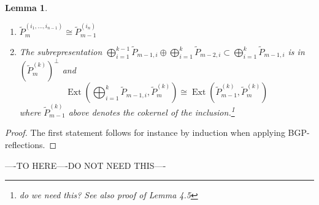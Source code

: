 \documentclass{amsart}
\newtheorem{lemma}[theorem]{Lemma}
\newcommand{\Ext}{\operatorname{Ext}}
\begin{document}
\begin{lemma}
  \begin{enumerate}
    \item $\tilde P_m^{(i_1,\ldots,i_{n-1})}\cong\tilde P_{m-1}^{(i_n)}$
    \item The subrepresentation $\bigoplus_{i=1}^{k-1}\tilde P_{m-1,i}\oplus\bigoplus_{i=1}^k\tilde P_{m-2,i}\subset\bigoplus_{i=1}^k\tilde P_{m-1,i}$ is in $(\tilde P_m^{(k)})^\perp$ and
      \[\Ext(\bigoplus_{i=1}^k\tilde P_{m-1,i},\tilde P_m^{(k)})\cong\Ext(\tilde P_{m-1}^{(k)},\tilde P_m^{(k)})\]
      where $\tilde P_{m-1}^{(k)}$ above denotes the cokernel of the inclusion.\footnote{do we need this? See also proof of Lemma 4.5}
  \end{enumerate}
\end{lemma}
\begin{proof}
The first statement follows for instance by induction when applying BGP-reflections.
\end{proof}
----TO HERE----DO NOT NEED THIS----
\end{document}
